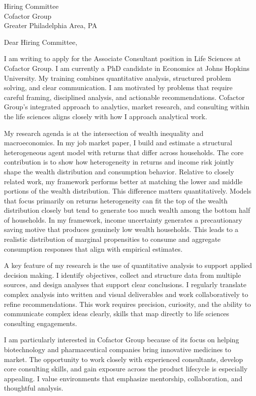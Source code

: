 \documentclass[11pt]{letter}
\begin{document}
\begin{letter}{Hiring Committee \\ Cofactor Group \\ Greater Philadelphia Area, PA}

\opening{Dear Hiring Committee,}

I am writing to apply for the Associate Consultant position in Life Sciences at Cofactor Group. I am currently a PhD candidate in Economics at Johns Hopkins University. My training combines quantitative analysis, structured problem solving, and clear communication. I am motivated by problems that require careful framing, disciplined analysis, and actionable recommendations. Cofactor Group’s integrated approach to analytics, market research, and consulting within the life sciences aligns closely with how I approach analytical work.

My research agenda is at the intersection of wealth inequality and macroeconomics. In my job market paper, I build and estimate a structural heterogeneous agent model with returns that differ across households. The core contribution is to show how heterogeneity in returns and income risk jointly shape the wealth distribution and consumption behavior. Relative to closely related work, my framework performs better at matching the lower and middle portions of the wealth distribution. This difference matters quantitatively. Models that focus primarily on returns heterogeneity can fit the top of the wealth distribution closely but tend to generate too much wealth among the bottom half of households. In my framework, income uncertainty generates a precautionary saving motive that produces genuinely low wealth households. This leads to a realistic distribution of marginal propensities to consume and aggregate consumption responses that align with empirical estimates.

A key feature of my research is the use of quantitative analysis to support applied decision making. I identify objectives, collect and structure data from multiple sources, and design analyses that support clear conclusions. I regularly translate complex analysis into written and visual deliverables and work collaboratively to refine recommendations. This work requires precision, curiosity, and the ability to communicate complex ideas clearly, skills that map directly to life sciences consulting engagements.

I am particularly interested in Cofactor Group because of its focus on helping biotechnology and pharmaceutical companies bring innovative medicines to market. The opportunity to work closely with experienced consultants, develop core consulting skills, and gain exposure across the product lifecycle is especially appealing. I value environments that emphasize mentorship, collaboration, and thoughtful analysis.


\end{letter}
\end{document}
